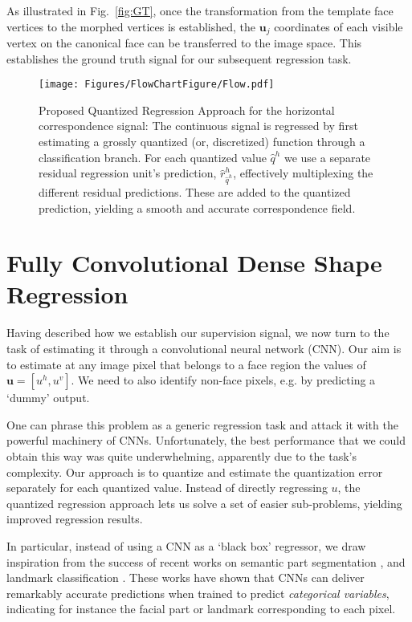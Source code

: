 \documentclass[10pt,twocolumn,letterpaper]{article}
\newcommand{\reffig}[1]{Fig.~\ref{#1}}
\begin{document}
As  illustrated in \reffig{fig:GT}, once the transformation from the template face vertices to the morphed vertices is established, the  $\bm{u}_j$ coordinates of each visible vertex on the canonical face can be transferred to the image space. This establishes the ground truth signal for our subsequent regression task.

\begin{figure*}[t]
\centering
\texttt{[image: Figures/FlowChartFigure/Flow.pdf]}
\caption{Proposed Quantized Regression Approach for the horizontal correspondence signal: The continuous  signal is regressed by first estimating a grossly quantized (or, discretized) function  through a classification branch. For each quantized value $\hat{q}^h$ we use a separate residual regression unit's prediction, $\hat{r}^h_{\hat{q}^h}$, effectively multiplexing the different residual predictions. These are added to the quantized prediction, yielding a smooth and accurate correspondence field. }
\vspace{-0.35cm}
\label{fig:Pipeline}
\end{figure*}\section{Fully Convolutional Dense Shape Regression }\label{sec:quantized}%

	Having described how we establish our supervision signal, we now turn to the task of estimating it through a convolutional neural network (CNN). 
		Our aim is to estimate at any image pixel that belongs to a face region the values of  $\bm{u} =[u^h, u^v]$. We need to also identify non-face pixels,  e.g. by predicting a `dummy' output. 
		
	One can phrase this problem as a generic regression task and attack it with the powerful machinery of CNNs. Unfortunately, the best performance that we could obtain this way was quite underwhelming, apparently due to the task's complexity. Our approach is to quantize and estimate the quantization error separately for each quantized value. Instead of directly regressing $u$, the quantized regression approach lets us solve a set of easier sub-problems, yielding improved regression results.

	
In particular,	instead of  using a CNN as a `black box' regressor, we draw inspiration from the success of recent works on semantic part  segmentation \cite{tsogkas2015deep,CP2016Deeplab}, and landmark classification \cite{bulat2016human,bulat2016two}. These works have shown that CNNs can deliver remarkably accurate predictions when trained to predict \textit{categorical variables}, indicating for instance the facial part or landmark corresponding to each pixel. 
	
\end{document}
